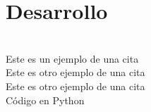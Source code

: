 \section{Desarrollo}

\blindtext[1] \\
Este es un ejemplo de una cita \cite{Sarker2014} \\
Este es otro ejemplo de una cita \citet{Topley2010} \\
Este es otro ejemplo de una cita \citep{Sarker2014} \\

Código en Python

